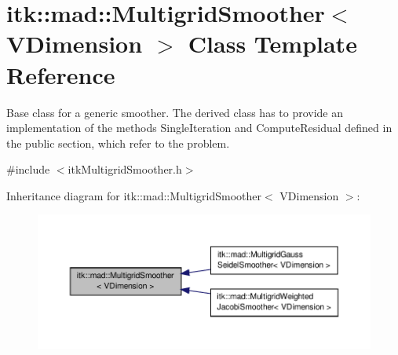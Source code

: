 \hypertarget{classitk_1_1mad_1_1_multigrid_smoother}{\section{itk\-:\-:mad\-:\-:Multigrid\-Smoother$<$ V\-Dimension $>$ Class Template Reference}
\label{classitk_1_1mad_1_1_multigrid_smoother}
}


Base class for a generic smoother. The derived class has to provide an implementation of the methods Single\-Iteration and Compute\-Residual defined in the public section, which refer to the problem.  




{\ttfamily \#include $<$itk\-Multigrid\-Smoother.\-h$>$}



Inheritance diagram for itk\-:\-:mad\-:\-:Multigrid\-Smoother$<$ V\-Dimension $>$\-:
\nopagebreak
\begin{figure}[H]
\begin{center}
\leavevmode
\includegraphics[width=350pt]{classitk_1_1mad_1_1_multigrid_smoother__inherit__graph}
\end{center}
\end{figure}
